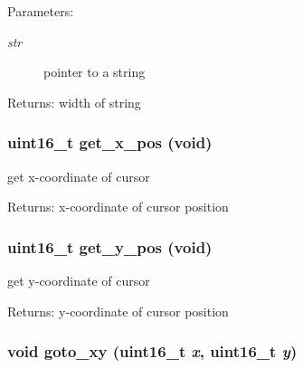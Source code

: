 \begin{Desc}
\item[Parameters:]
\begin{description}
\item[{\em str}]pointer to a string \end{description}
\end{Desc}
\begin{Desc}
\item[Returns:]width of string \end{Desc}
\hypertarget{group__hgdi__api_g7e9d358d7d7d5d19b78da9ca5c630fce}{
\subsubsection[{get\_\-x\_\-pos}]{\setlength{\rightskip}{0pt plus 5cm}uint16\_\-t get\_\-x\_\-pos (void)}}
\label{group__hgdi__api_g7e9d358d7d7d5d19b78da9ca5c630fce}


get x-coordinate of cursor 

\begin{Desc}
\item[Returns:]x-coordinate of cursor position \end{Desc}
\hypertarget{group__hgdi__api_g0237f5d1affe3493f0f428a66d7d1290}{
\subsubsection[{get\_\-y\_\-pos}]{\setlength{\rightskip}{0pt plus 5cm}uint16\_\-t get\_\-y\_\-pos (void)}}
\label{group__hgdi__api_g0237f5d1affe3493f0f428a66d7d1290}


get y-coordinate of cursor 

\begin{Desc}
\item[Returns:]y-coordinate of cursor position \end{Desc}
\hypertarget{group__hgdi__api_g7601be835bcebe7b3cdde530f1eee8ae}{
\subsubsection[{goto\_\-xy}]{\setlength{\rightskip}{0pt plus 5cm}void goto\_\-xy (uint16\_\-t {\em x}, \/  uint16\_\-t {\em y})}}
\label{group__hgdi__api_g7601be835bcebe7b3cdde530f1eee8ae}


